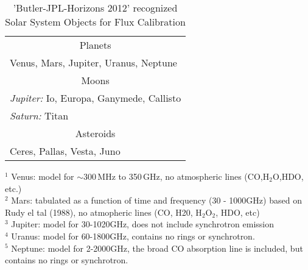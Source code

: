 \vspace{5mm}
\begin{table}[h!]
\caption{'Butler-JPL-Horizons 2012' recognized Solar System Objects for Flux Calibration
        {\label{table:fluxcal-table-solarsystem}}}
\begin{center}
\begin{tabular}{|l|} \hline
\hline
\multicolumn{1}{|c|}{Planets} \\

Venus\footnotemark[1], Mars\footnotemark[2], Jupiter\footnotemark[3], Uranus\footnotemark[4], Neptune\footnotemark[5]\\
\hline
\multicolumn{1}{|c|}{Moons}\\
{\it Jupiter:}  Io, Europa, Ganymede, Callisto\\
{\it Saturn:}  Titan\footnotemark[7] \\
\hline
\multicolumn{1}{|c|}{Asteroids}\\
Ceres, Pallas\footnotemark[8], Vesta\footnotemark[8],
Juno\footnotemark[8]\\
\hline
\end{tabular}
\end{center}
\footnotesize
$^1$ Venus: model for $\sim300$\,MHz to 350\,GHz, no atmospheric lines
(CO,H$_2$O,HDO, etc.)\\
$^2$ Mars: tabulated as a function of time and frequency (30 - 1000GHz) based on 
               Rudy el tal (1988), no atmopheric lines (CO, H20, H$_2$O$_2$, HDO, etc)\\
$^3$ Jupiter: model for 30-1020GHz, does not include synchrotron
emission\\
$^4$ Uranus: model for 60-1800GHz, contains no rings or synchrotron.\\
$^5$ Neptune: model for 2-2000GHz, the broad CO absorption line
               is included, but contains no rings or synchrotron. \\


\end{table}
